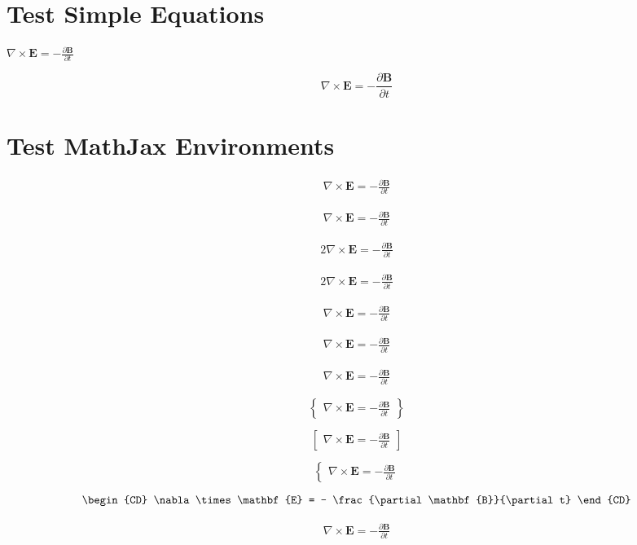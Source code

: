 \documentclass[]{article}
\date{}
\begin{document}
\newcommand\example{\nabla \times \mathbf{E} = - \frac{\partial \mathbf{B}}{\partial t}}

\section{Test Simple Equations}\label{test-simple-equations}

\(\example\)

\[\example\]

\section{Test MathJax Environments}\label{test-mathjax-environments}

\begin{align}
\example
\end{align}

\begin{align*}
\example
\end{align*}

\begin{alignat}{2}
\example
\end{alignat}

\begin{alignat*}{2}
\example
\end{alignat*}

\[\begin{aligned}
\example
\end{aligned}\]

\[\begin{alignedat}{2}
\example
\end{alignedat}\]

\[\begin{array}{lcl}
\example
\end{array}\]

\[\begin{Bmatrix}
\example
\end{Bmatrix}\]

\[\begin{bmatrix}
\example
\end{bmatrix}\]

\[\begin{cases}
\example
\end{cases}\]

\[\begin{CD}
\example
\end{CD}\]

\begin{eqnarray}
\example
\end{eqnarray}
\end{document}

